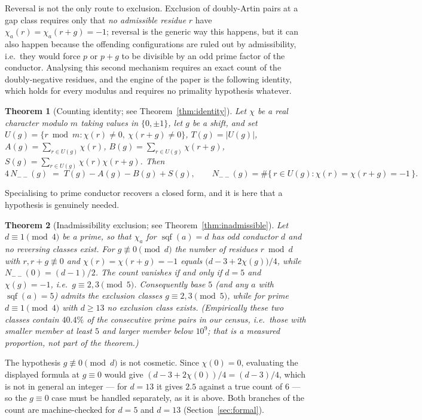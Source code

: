 \documentclass[11pt,reqno]{amsart}
\theoremstyle{plain}
\newtheorem{theorem}{Theorem}
\theoremstyle{definition}
\DeclareMathOperator{\sqf}{sqf}
\begin{document}
Reversal is not the only route to exclusion. Exclusion of doubly-Artin pairs
at a gap class requires only that \emph{no admissible residue} $r$ have
$\chi_a(r) = \chi_a(r+g) = -1$; reversal is the generic way this happens, but
it can also happen because the offending configurations are ruled out by
admissibility, i.e.\ they would force $p$ or $p+g$ to be divisible by an odd
prime factor of the conductor. Analysing this second mechanism requires an
exact count of the doubly-negative residues, and the engine of the paper is
the following identity, which holds for every modulus and requires no
primality hypothesis whatever.

\begin{theorem}[Counting identity; see Theorem~\ref{thm:identity}]
Let $\chi$ be a real character modulo $m$ taking values in $\{0, \pm 1\}$, let
$g$ be a shift, and set
$U(g) = \{ r \bmod m : \chi(r) \neq 0,\ \chi(r+g) \neq 0 \}$,
$T(g) = |U(g)|$, $A(g) = \sum_{r \in U(g)} \chi(r)$,
$B(g) = \sum_{r \in U(g)} \chi(r+g)$,
$S(g) = \sum_{r \in U(g)} \chi(r)\chi(r+g)$. Then
\[
  4\, N_{--}(g) \;=\; T(g) - A(g) - B(g) + S(g),
  \qquad
  N_{--}(g) = \#\{\, r \in U(g) : \chi(r) = \chi(r+g) = -1 \,\}.
\]
\end{theorem}

Specialising to prime conductor recovers a closed form, and it is here that a
hypothesis is genuinely needed.

\begin{theorem}[Inadmissibility exclusion; see Theorem~\ref{thm:inadmissible}]
Let $d \equiv 1 \pmod 4$ be a prime, so that $\chi_a$ for $\sqf(a) = d$ has
odd conductor $d$ and no reversing classes exist. For $g \not\equiv 0 \pmod d$
the number of residues $r \bmod d$ with $r, r+g \not\equiv 0$ and
$\chi(r) = \chi(r+g) = -1$ equals $\bigl(d - 3 + 2\chi(g)\bigr)/4$, while
$N_{--}(0) = (d-1)/2$. The count vanishes if and only if $d = 5$ and
$\chi(g) = -1$, i.e.\ $g \equiv 2, 3 \pmod 5$. Consequently base $5$ (and any
$a$ with $\sqf(a) = 5$) admits the exclusion classes $g \equiv 2, 3 \pmod 5$,
while for prime $d \equiv 1 \pmod 4$ with $d \ge 13$ no exclusion class
exists. (Empirically these two classes contain $40.4\%$ of the consecutive
prime pairs in our census, i.e.\ those with smaller member at least $5$ and
larger member below $10^9$; that is a measured proportion, not part of the
theorem.)
\end{theorem}

The hypothesis $g \not\equiv 0 \pmod d$ is not cosmetic. Since $\chi(0) = 0$,
evaluating the displayed formula at $g \equiv 0$ would give
$(d - 3 + 2\chi(0))/4 = (d-3)/4$, which is not in general an integer --- for
$d = 13$ it gives $2.5$ against a true count of $6$ --- so the $g \equiv 0$
case must be handled separately, as it is above. Both branches of the count
are machine-checked for $d = 5$ and $d = 13$ (Section~\ref{sec:formal}).
\end{document}
